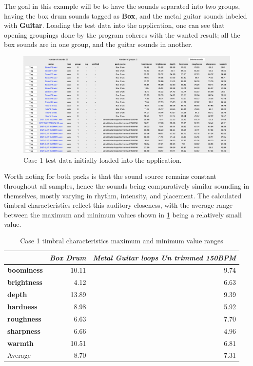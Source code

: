 The goal in this example will be to have the sounds separated into two groups, having the box drum sounds tagged as \textbf{Box}, and the metal guitar sounds labeled with \textbf{Guitar}. Loading the test data into the application, one can see that opening groupings done by the program coheres with the wanted result; all the box sounds are in one group, and the guitar sounds in another.
\begin{figure}[ht]
    \includegraphics[width=\textwidth]{figures/case_1/initial}
    \caption{Case 1 test data initially loaded into the application.}\label{fig:case_1/initial}
\end{figure}

Worth noting for both packs is that the sound source remains constant throughout all samples, hence the sounds being comparatively similar sounding in themselves, mostly varying in rhythm, intensity, and placement. The calculated timbral characteristics reflect this auditory closeness, with the average range between the maximum and minimum values shown in \cref{tab:case_1} being a relatively small value.
\begin{table}[ht]
    \caption[Case 1 timbral characteristics max and min ranges]{Case 1 timbral characteristics maximum and minimum value ranges}\label{tab:case_1}
    \begin{tabular*}{\textwidth}{@{\extracolsep{\fill}}lrr}
        \toprule
        & \emph{Box Drum} & \emph{Metal Guitar loops Un trimmed 150BPM} \\
        \midrule
        \textbf{boominess} & 10.11 & 9.74 \\
        \textbf{brightness} & 4.12 & 6.63 \\
        \textbf{depth} & 13.89 & 9.39 \\
        \textbf{hardness} & 8.98 & 5.92 \\
        \textbf{roughness} & 6.63 & 7.70 \\
        \textbf{sharpness} & 6.66 & 4.96 \\
        \textbf{warmth} & 10.51 & 6.81 \\
        \midrule
        Average & 8.70 & 7.31 \\
        \bottomrule
    \end{tabular*}
\end{table}

